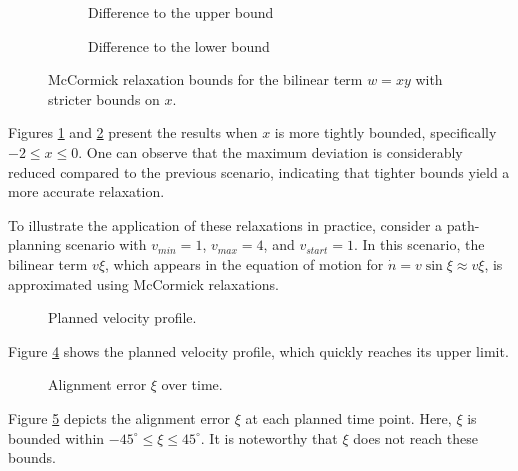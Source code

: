 \begin{figure}[h]
	\centering
	\begin{subfigure}[b]{0.45\textwidth}
		\centering
		\resizebox{\textwidth}{!}{}
		\caption{Difference to the upper bound}
		\label{fig:mccormick_1_upper}
	\end{subfigure}
	\hfill
	\begin{subfigure}[b]{0.45\textwidth}
		\centering
		\resizebox{\textwidth}{!}{}
		\caption{Difference to the lower bound}
		\label{fig:mccormick_1_lower}
	\end{subfigure}
	\caption{McCormick relaxation bounds for the bilinear term \( w = xy \) with stricter bounds on \( x \).}
	\label{fig:mccormick_bounds_1}
\end{figure}

Figures \ref{fig:mccormick_1_upper} and \ref{fig:mccormick_1_lower} present the results when \( x \) is more tightly bounded, specifically \( -2 \leq
x \leq 0 \).
One can observe that the maximum deviation is considerably reduced compared to the previous scenario, indicating that tighter bounds yield a more
accurate relaxation.

To illustrate the application of these relaxations in practice, consider a path-planning scenario with \( v_{min} = 1 \), \( v_{max} = 4 \), and \(
v_{start} = 1 \).
In this scenario, the bilinear term \( v\xi \), which appears in the equation of motion for \(\dot{n} = v \sin{\xi} \approx v\xi\), is approximated
using McCormick relaxations.

\begin{figure}[h]
	\centering
	\resizebox{1\textwidth}{!}{}
	\caption{Planned velocity profile.}
	\label{fig:velocity}
\end{figure}

Figure \ref{fig:velocity} shows the planned velocity profile, which quickly reaches its upper limit.

\begin{figure}[h]
	\centering
	\resizebox{1\textwidth}{!}{}
	\caption{Alignment error \(\xi\) over time.}
	\label{fig:alignment-error}
\end{figure}

Figure \ref{fig:alignment-error} depicts the alignment error \( \xi \) at each planned time point.
Here, \( \xi \) is bounded within \(-45^{\circ} \leq \xi \leq 45^{\circ} \).
It is noteworthy that \( \xi \) does not reach these bounds.

